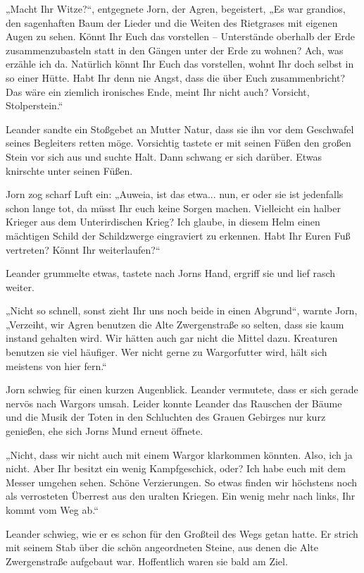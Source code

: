 „Macht Ihr Witze?“, entgegnete Jorn, der Agren, begeistert, „Es war grandios, den sagenhaften Baum der Lieder und die Weiten des Rietgrases mit eigenen Augen zu sehen. Könnt Ihr Euch das vorstellen – Unterstände oberhalb der Erde zusammenzubasteln statt in den Gängen unter der Erde zu wohnen? Ach, was erzähle ich da. Natürlich könnt Ihr Euch das vorstellen, wohnt Ihr doch selbst in so einer Hütte. Habt Ihr denn nie Angst, dass die über Euch zusammenbricht? Das wäre ein ziemlich ironisches Ende, meint Ihr nicht auch? Vorsicht, Stolperstein.“

Leander sandte ein Stoßgebet an Mutter Natur, dass sie ihn vor dem Geschwafel seines Begleiters retten möge. Vorsichtig tastete er mit seinen Füßen den großen Stein vor sich aus und suchte Halt. Dann schwang er sich darüber. Etwas knirschte unter seinen Füßen.

Jorn zog scharf Luft ein: „Auweia, ist das etwa... nun, er oder sie ist jedenfalls schon lange tot, da müsst Ihr euch keine Sorgen machen. Vielleicht ein halber Krieger aus dem Unterirdischen Krieg? Ich glaube, in diesem Helm einen mächtigen Schild der Schildzwerge eingraviert zu erkennen. Habt Ihr Euren Fuß vertreten? Könnt Ihr weiterlaufen?“

Leander grummelte etwas, tastete nach Jorns Hand, ergriff sie und lief rasch weiter.

„Nicht so schnell, sonst zieht Ihr uns noch beide in einen Abgrund“, warnte Jorn, „Verzeiht, wir Agren benutzen die Alte Zwergenstraße so selten, dass sie kaum instand gehalten wird. Wir hätten auch gar nicht die Mittel dazu. Kreaturen benutzen sie viel häufiger. Wer nicht gerne zu Wargorfutter wird, hält sich meistens von hier fern.“

Jorn schwieg für einen kurzen Augenblick. Leander vermutete, dass er sich gerade nervös nach Wargors umsah. Leider konnte Leander das Rauschen der Bäume und die Musik der Toten in den Schluchten des Grauen Gebirges nur kurz genießen, ehe sich Jorns Mund erneut öffnete.

„Nicht, dass wir nicht auch mit einem Wargor klarkommen könnten. Also, ich ja nicht. Aber Ihr besitzt ein wenig Kampfgeschick, oder? Ich habe euch mit dem Messer umgehen sehen. Schöne Verzierungen. So etwas finden wir höchstens noch als verrosteten Überrest aus den uralten Kriegen. Ein wenig mehr nach links, Ihr kommt vom Weg ab.“

Leander schwieg, wie er es schon für den Großteil des Wegs getan hatte. Er strich mit seinem Stab über die schön angeordneten Steine, aus denen die Alte Zwergenstraße aufgebaut war. Hoffentlich waren sie bald am Ziel.



